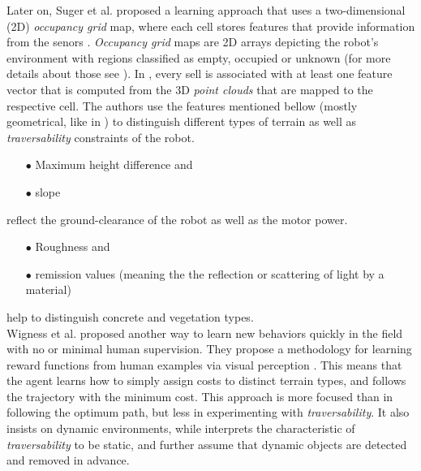 \documentclass[12pt,a4paper]{report}
\newcommand{\term}{\textit}
\newcommand{\acronym}{\MakeUppercase}
\begin{document}
	Later on, Suger et al. proposed a learning approach that uses a two-dimensional 
	(\acronym{2d}) \term{occupancy grid} map, where each cell stores features 
	that provide information from the senors \cite{Suger}. \term{Occupancy grid} 
	maps are \acronym{2d} arrays depicting the robot’s environment with regions 
	classified as empty, occupied or unknown (for more details about those see 
	\cite{Moravec}). In \cite{Suger}, every sell is associated with at least one 
	feature vector that is computed from the \acronym{3d} \term{point clouds} that 
	are mapped to the respective cell. The authors use the features mentioned 
	bellow (mostly geometrical, like in \cite{Lalonde}) to distinguish different 
	types of terrain as well as \term{traversability} constraints of the robot. 
	\begin{enumerate}
		\item[$\bullet$] Maximum height difference and
		\item[$\bullet$] slope 
	\end{enumerate}
	reflect the ground-clearance of the robot as well as the motor power.
	\begin{enumerate}
		\item[$\bullet$] Roughness and
		\item[$\bullet$] remission values (meaning the the reflection or scattering 
		of light by a material) 
	\end{enumerate}
	help to distinguish concrete and vegetation types.
	\\
	
	Wigness et al. proposed another way to learn new behaviors quickly in the 
	field with no or minimal human supervision. They propose a methodology for 
	learning reward functions from human examples via visual perception 
	\cite{Wigness}. This means that the agent learns how to simply assign costs 
	to distinct terrain types, and follows the trajectory with the minimum cost. 
	This approach is more focused than \cite{Suger} in following the optimum path, 
	but less in experimenting with \term{traversability}. It also insists on 
	dynamic environments, while \cite{Suger} interprets the characteristic of 
	\term{traversability} to be static, and further assume that dynamic objects 
	are detected and removed in advance.
	\\
	
	
	
	
	
	
	
\end{document}
